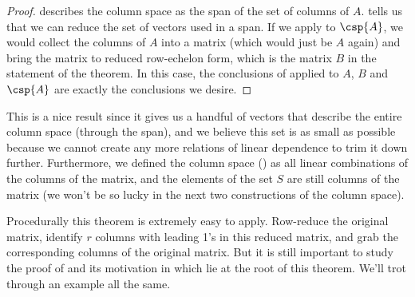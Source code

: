 %
\begin{proof}
 describes the column space as the span of the set of columns of $A$.   tells us that we can reduce the set of vectors used in a span.  If we apply  to $\csp{A}$, we would collect the columns of $A$ into a matrix (which would just be $A$ again) and bring the matrix to reduced row-echelon form, which is the matrix $B$ in the statement of the theorem.  In this case, the conclusions of  applied to $A$,  $B$ and $\csp{A}$ are exactly the conclusions we desire.
%
\end{proof}
%
This is a nice result since it gives us a handful of vectors that describe the entire column space (through the span), and we believe this set is as small as possible because we cannot create any more relations of linear dependence to trim it down further.  Furthermore, we defined the column space () as all linear combinations of the columns of the matrix, and the elements of the set $S$ are still columns of the matrix (we won't be so lucky in the next two constructions of the column space).\par
%
Procedurally this theorem is extremely easy to apply.  Row-reduce the original matrix, identify $r$ columns with leading 1's in this reduced matrix, and grab the corresponding columns of the original matrix.  But it is still important to study the proof of  and its motivation in  which lie at the root of this theorem.  We'll trot through an example all the same.
%
